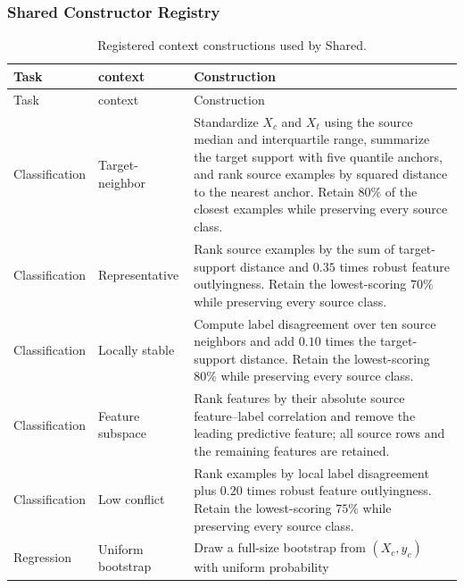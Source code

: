\subsubsection{Shared Constructor Registry}

\begingroup
  \scriptsize
  \setlength{\tabcolsep}{3pt}
  \renewcommand{\arraystretch}{1.04}
  \begin{longtable}{@{}>{\raggedright\arraybackslash}p{}
                         >{\raggedright\arraybackslash}p{}
                         >{\raggedright\arraybackslash}p{}@{}}
    \caption{Registered context constructions used by Shared.}
    \label{tab:shared-context-bank}\\
    \toprule
    Task & context & Construction \\
    \midrule
    \endfirsthead
    \toprule
    Task & context & Construction \\
    \midrule
    \endhead
    \bottomrule
    \endfoot
    Classification
      & Target-neighbor
      & Standardize $X_c$ and $X_t$ using the source median and interquartile
        range, summarize the target support with five quantile anchors, and
        rank source examples by squared distance to the nearest anchor. Retain
        $80\%$ of the closest examples while preserving every source class. \\
    Classification
      & Representative
      & Rank source examples by the sum of target-support distance and
        $0.35$ times robust feature outlyingness. Retain the lowest-scoring
        $70\%$ while preserving every source class. \\
    Classification
      & Locally stable
      & Compute label disagreement over ten source neighbors and add
        $0.10$ times the target-support distance. Retain the lowest-scoring
        $80\%$ while preserving every source class. \\
    Classification
      & Feature subspace
      & Rank features by their absolute source feature--label correlation and
        remove the leading predictive feature; all source rows and the
        remaining features are retained. \\
    Classification
      & Low conflict
      & Rank examples by local label disagreement plus $0.20$ times robust
        feature outlyingness. Retain the lowest-scoring $75\%$ while
        preserving every source class. \\
    \midrule
    Regression
      & Uniform bootstrap
      & Draw a full-size bootstrap from $(X_c,y_c)$ with uniform probability

\end{longtable}
